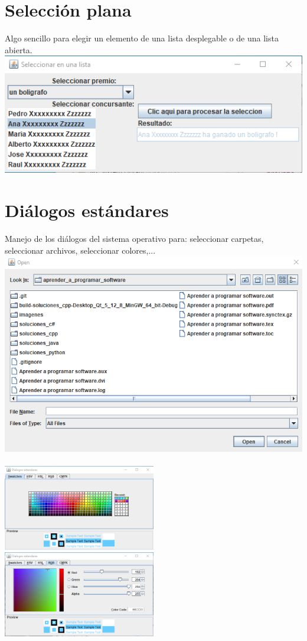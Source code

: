 \documentclass[spanish,12pt,a4paper,final,oneside]{book}
\begin{document}
\section{Selección plana}\label{ejercicio_selecionplana}
Algo sencillo para elegir un elemento de una lista desplegable o de una lista abierta.
\\\includegraphics[width=\textwidth]{Seleccion Plana - pantallazo - Java}

\section{Diálogos estándares}\label{ejercicio_dialogos}
Manejo de los diálogos del sistema operativo para: seleccionar carpetas, seleccionar archivos, seleccionar colores,...
\\\includegraphics[width=\textwidth]{Dialogos Estandares - JFileChooser - Java}
\\\\
\includegraphics[width=0.5\textwidth]{Dialogos Estandares - JColorChooser - Swatches - Java}
\includegraphics[width=0.5\textwidth]{Dialogos Estandares - JColorChooser - RGB - Java}
\end{document}
